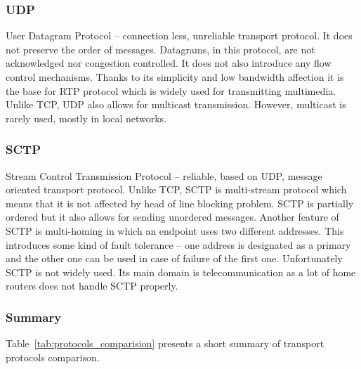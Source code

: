 \subsubsection{UDP}
User Datagram Protocol -- connection less, unreliable transport protocol.
It does not preserve the order of messages.
Datagrams, in this protocol, are not acknowledged nor congestion controlled.
It does not also introduce any flow control mechanisms.
Thanks to its simplicity and low bandwidth affection it is the base for RTP protocol which is widely used for transmitting multimedia.
Unlike TCP, UDP also allows for multicast transmission.
However, multicast is rarely used, mostly in local networks.

\subsubsection{SCTP}
Stream Control Transmission Protocol -- reliable, based on UDP, message oriented transport protocol.
Unlike TCP, SCTP is multi-stream protocol which means that it is not affected by head of line blocking problem.
SCTP is partially ordered but it also allows for sending unordered messages.
Another feature of SCTP is multi-homing in which an endpoint uses two different addresses.
This introduces some kind of fault tolerance -- one address is designated as a primary and the other one can be used in case of failure of the first one.
Unfortunately SCTP is not widely used.
Its main domain is telecommunication as a lot of home routers does not handle SCTP properly.

\subsubsection{Summary}
Table~\ref{tab:protocols_comparision} presents a short summary of transport protocols comparison.
\begin{table}
    \centering
    \caption{\label{tab:protocols_comparision}Transport protocols comparison.}
\end{table}
